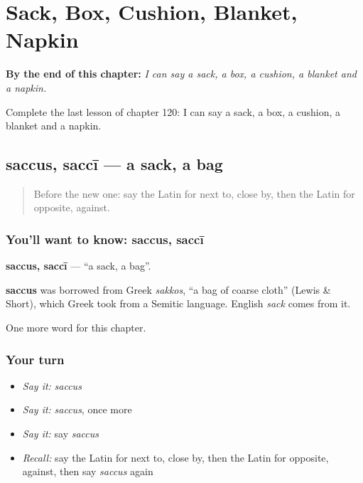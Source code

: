 
\chapter{Sack, Box, Cushion, Blanket, Napkin}
\label{ch:la-sack-box-cushion-blanket-napkin}

\begin{chapteropening}
\textbf{By the end of this chapter:} \emph{I can say a sack, a box, a cushion, a blanket and a napkin.}

Complete the last lesson of chapter 120: I can say a sack, a box, a cushion, a blanket and a napkin.
\end{chapteropening}

\section[saccus, saccī]{saccus, saccī — a sack, a bag}

\label{lesson:LA-C120-saccus}



\begin{quote}
Before the new one: say the Latin for next to, close by, then the Latin for opposite, against.
\end{quote}

\subsection*{You'll want to know: saccus, saccī}
\textbf{saccus, saccī} — \textquotedblleft{}a sack, a bag\textquotedblright{}.

\begin{cousinweb}
\textbf{saccus} was borrowed from Greek \emph{sakkos}, \textquotedblleft{}a bag of coarse cloth\textquotedblright{} (Lewis \& Short), which Greek took from a Semitic language. English \emph{sack} comes from it.
\end{cousinweb}

\begin{grammarlens}[title={What you've built}]
One more word for this chapter.
\end{grammarlens}

\subsection*{Your turn}
\begin{itemize}
\raggedright
  \item \emph{Say it:} \emph{saccus}
  \item \emph{Say it:} \emph{saccus}, once more
  \item \emph{Say it:} say \emph{saccus}
  \item \emph{Recall:} say the Latin for next to, close by, then the Latin for opposite, against, then say \emph{saccus} again
\end{itemize}

